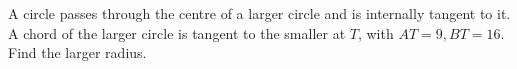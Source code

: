 A circle passes through the centre of a larger circle and is internally tangent to it. A chord of the larger circle is tangent to the smaller at $T$, with $AT=9,BT=16$. Find the larger radius.
